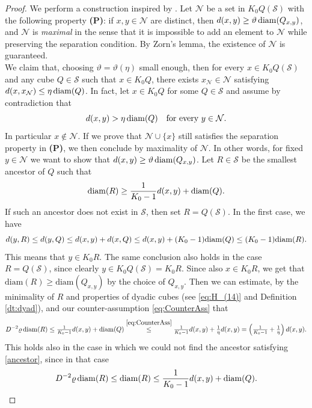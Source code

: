 \documentclass[12pt]{amsart}
\newcommand{\diam}{{\rm diam}}
\renewcommand{\rho}{\varrho}
\renewcommand{\theta}{\vartheta}
\numberwithin{equation}{section}
\theoremstyle{plain}
\theoremstyle{definition}
\theoremstyle{remark}
\begin{document}
\begin{proof}
We perform a construction inspired by \cite[Remark 6.4.3]{Bate}. Let $\mathcal N$ be a 
set in $K_0Q(\mathcal S)$ with the following property \textbf{(P)}:
 if $x,y\in\mathcal N$ are distinct, then $d(x,y)\geq \theta\,\diam(Q_{x,y})$, and $\mathcal{N}$ is \emph{maximal} in the sense that it is impossible to add an element to $\mathcal{N}$ while preserving the separation condition.
By Zorn's lemma, the existence of $\mathcal N$ is guaranteed.\\
 We claim that, choosing $\theta=\theta(\eta)$ small enough, then for every $x\in K_0 Q(\mathcal S)$ and any cube $Q\in\mathcal S$ such that $x\in K_0 Q$, there exists $x_\mathcal N\in\mathcal N$ satisfying $d(x,x_\mathcal N)\leq \eta\, \diam(Q)$. In fact, 
let $x\in K_0 Q$ for some $Q\in\mathcal S$ and assume by contradiction that 
\begin{equation}\label{eq:CounterAss}
d(x,y)>\eta\,\diam(Q)\quad \text{for every }y\in\mathcal N.
\end{equation}
In particular $x\not\in\mathcal N$. If we prove that $\mathcal N \cup \{x\}$ still satisfies the separation property in \textbf{(P)}, we then conclude by maximality of $\mathcal N$. In other words, for fixed $y\in\mathcal N$ we want to show that $d(x,y)\geq \theta\, \diam(Q_{x,y})$. Let $R\in\mathcal S$ be the smallest ancestor of $Q$ such that 
\begin{equation}\label{ancestor}\diam(R)\geq \frac{1}{K_0-1}d(x,y)+\diam(Q).\end{equation}
If such an ancestor does not exist in $\mathcal S$, then set $R=Q(\mathcal S)$. In the first case, we have
\[d(y,R)\leq d(y,Q)\leq d(x,y)+d(x,Q)\leq d(x,y)+(K_0-1)\diam(Q)\leq (K_0-1)\diam (R).\]
This means that $y\in K_0 R$. The same conclusion also holds in the case $R=Q(\mathcal S)$, since clearly $y\in K_0 Q(\mathcal S)=K_0 R$. Since also $x\in K_0 R$, we get that $\mathrm{diam}(R)\geq \mathrm{diam}(Q_{x,y})$ by the choice of $Q_{x,y}$. 
Then we can estimate, by the minimality of $R$ and properties of dyadic cubes (see \eqref{eq:H_(14)} and Definition \ref{dt:dyad}), and our counter-assumption \eqref{eq:CounterAss} that
\[\begin{split}D^{-2}\rho\,\diam (R)\leq \tfrac{1}{K_0-1}d(x,y)+\diam(Q)\overset{\eqref{eq:CounterAss}}{\leq} \tfrac{1}{K_0-1}d(x,y)+\tfrac{1}{\eta}d(x,y)=\left(\tfrac{1}{K_0-1}+\tfrac{1}{\eta}\right)d(x,y).\end{split}\]
This holds also in the case in which we could not find the ancestor satisfying \eqref{ancestor}, since in that case
\[D^{-2}\rho\,\diam (R)\leq \diam(R)\leq \frac{1}{K_0-1}d(x,y)+\diam(Q).\]

\end{proof}
\end{document}
